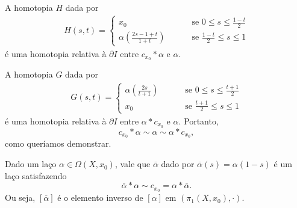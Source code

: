 \begin{dem}
    A homotopia $H$ dada por 
    \begin{align*}
        H(s,t)=\begin{cases}
            x_0\qquad &\mbox{ se }0\le s \le \frac{1-t}{2}\\
            \alpha(\frac{2s-1+t}{1+t}) \qquad &\mbox{ se }\frac{1-t}{2}\le s\le 1
        \end{cases}
    \end{align*}
    é uma homotopia relativa à $\partial I$ entre $c_{x_0}*\alpha$ e $\alpha.$
    
    A homotopia $G$ dada por 
    \begin{align*}
        G(s,t)=\begin{cases}
            \alpha(\frac{2s}{t+1})\qquad &\mbox{ se }0\le s \le \frac{t+1}{2}\\
            x_0\qquad &\mbox{ se }\frac{t+1}{2}\le s \le 1
        \end{cases}
    \end{align*}
    é uma homotopia relativa à $\partial I$ entre $\alpha*c_{x_0}$ e $\alpha.$ Portanto, $$c_{x_0}*\alpha\sim\alpha\sim\alpha*c_{x_0},$$ como queríamos demonstrar.
\end{dem}

\begin{lemma}
    Dado um laço $\alpha \in \Omega(X,x_0)$, vale que $\overline{\alpha}$ dado por $\overline{\alpha}(s)=\alpha(1-s)$ é um laço satisfazendo 
    $$\overline{\alpha}*\alpha\sim c_{x_0}=\alpha*\overline{\alpha}.$$
    Ou seja, $[\overline{\alpha}]$ é o elemento inverso de $[\alpha]$ em $(\pi_1(X,x_0),\cdot)$.
\end{lemma}

